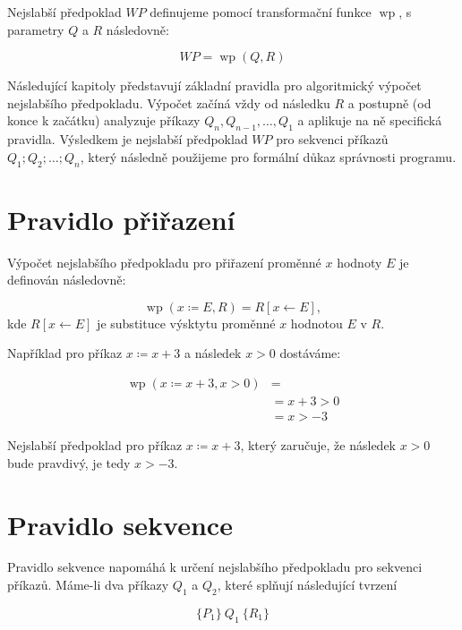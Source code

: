 Nejslabší předpoklad $WP$ definujeme pomocí transformační funkce $\operatorname{wp}$,
s parametry $Q$ a $R$ následovně:

\begin{equation*}
    WP = \operatorname{wp}(Q, R)
\end{equation*}

Následující kapitoly představují základní pravidla pro algoritmický výpočet nejslabšího předpokladu.
Výpočet začíná vždy od následku $R$ a postupně (od konce k začátku)
analyzuje příkazy $Q_n, Q_{n-1}, \ldots, Q_1$ a aplikuje na ně specifická pravidla.
Výsledkem je nejslabší předpoklad $WP$ pro sekvenci příkazů $Q_1; Q_2; \ldots; Q_n$,
který následně použijeme pro formální důkaz správnosti programu.

\section{Pravidlo přiřazení}
\label{sec:pravidlo-prirazeni}

Výpočet nejslabšího předpokladu pro přiřazení proměnné $x$ hodnoty $E$ je
definován následovně:

\begin{equation*}
    \operatorname{wp}(x \coloneqq E, R) = R[x \leftarrow E],
\end{equation*}
kde $R[x \leftarrow E]$ je substituce výsktytu proměnné $x$ hodnotou $E$ v $R$.

Například pro příkaz $x \coloneqq x + 3$ a následek $x > 0$ dostáváme:

\begin{align*}
    \operatorname{wp}(x \coloneqq x + 3, x > 0) & = \\
                                 & = x + 3 > 0 \\
                                 & = x > -3
\end{align*}

Nejslabší předpoklad pro příkaz $x \coloneqq x + 3$, který zaručuje, že
následek $x > 0$ bude pravdivý, je tedy $x > -3$.

\section{Pravidlo sekvence}
\label{sec:pravidlo-sekvence}

Pravidlo sekvence napomáhá k určení nejslabšího předpokladu pro sekvenci příkazů.
Máme-li dva příkazy $Q_1$ a $Q_2$, které splňují následující tvrzení

\begin{equation*}
    \{ P_1 \} \  Q_1 \  \{ R_1 \}
\end{equation*}

